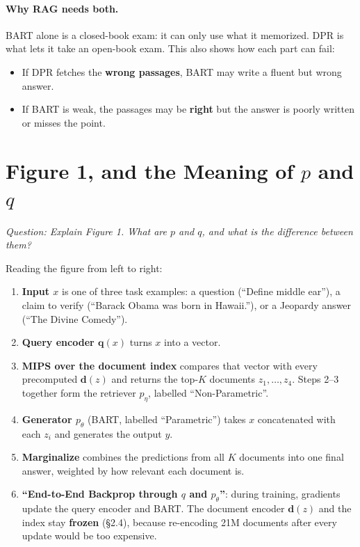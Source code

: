 \documentclass[11pt]{article}
\newcommand{\question}[1]{\noindent\textit{Question: #1}\par\medskip}
\begin{document}
\paragraph{Why RAG needs both.}
BART alone is a closed-book exam: it can only use what it memorized. DPR is what lets it take an open-book exam. This also shows how each part can fail:
\begin{itemize}[nosep]
  \item If DPR fetches the \textbf{wrong passages}, BART may write a fluent but wrong answer.
  \item If BART is weak, the passages may be \textbf{right} but the answer is poorly written or misses the point.
\end{itemize}

\section{\texorpdfstring{Figure 1, and the Meaning of $p$ and $q$}{Figure 1, and the Meaning of p and q}}
\question{Explain Figure 1. What are $p$ and $q$, and what is the difference between them?}

Reading the figure from left to right:
\begin{enumerate}[nosep]
  \item \textbf{Input $x$} is one of three task examples: a question (``Define middle ear''), a claim to verify (``Barack Obama was born in Hawaii.''), or a Jeopardy answer (``The Divine Comedy'').
  \item \textbf{Query encoder $\mathbf{q}(x)$} turns $x$ into a vector.
  \item \textbf{MIPS over the document index} compares that vector with every precomputed $\mathbf{d}(z)$ and returns the top-$K$ documents $z_1, \dots, z_4$. Steps 2--3 together form the retriever $p_\eta$, labelled ``Non-Parametric''.
  \item \textbf{Generator $p_\theta$} (BART, labelled ``Parametric'') takes $x$ concatenated with each $z_i$ and generates the output $y$.
  \item \textbf{Marginalize} combines the predictions from all $K$ documents into one final answer, weighted by how relevant each document is.
  \item \textbf{``End-to-End Backprop through $q$ and $p_\theta$''}: during training, gradients update the query encoder and BART. The document encoder $\mathbf{d}(z)$ and the index stay \textbf{frozen} (\S2.4), because re-encoding 21M documents after every update would be too expensive.
\end{enumerate}
\end{document}

